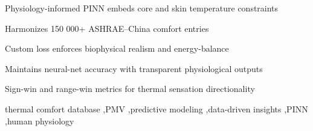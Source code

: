 \documentclass[final,1p,times]{elsarticle}
\begin{document}
\begin{frontmatter}
\begin{abstract}

\end{abstract}


\begin{highlights}
\item Physiology-informed PINN embeds core and skin temperature constraints  
\item Harmonizes 150 000+ ASHRAE–China comfort entries  
\item Custom loss enforces biophysical realism and energy-balance  
\item Maintains neural-net accuracy with transparent physiological outputs
\item Sign-win and range-win metrics for thermal sensation directionality 
\end{highlights}

\begin{keyword}
thermal comfort database \sep PMV \sep predictive modeling \sep data-driven insights \sep PINN \sep human physiology
\end{keyword}

\end{frontmatter}



\clearpage
\end{document}
